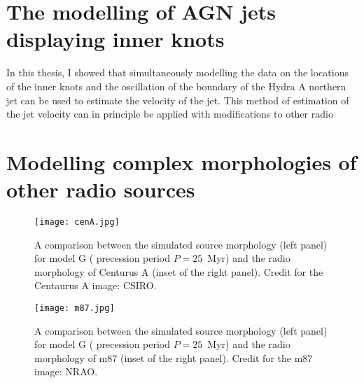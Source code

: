 
\section{The modelling of AGN jets displaying inner knots}
In this thesis, I showed that simultaneously modelling the data on the locations of the inner knots and the oscillation of the boundary of the Hydra A northern jet can be used to estimate the velocity of the jet. This method of estimation of the jet velocity can in principle be applied with modifications to other radio

\section{Modelling complex morphologies of other radio sources}
\begin{figure}
\centering
\texttt{[image: cenA.jpg]}
\caption{ A comparison between the simulated source morphology (left panel) for model G ( precession period $P = 25$~Myr) and the radio morphology of Centurus A (inset of the right panel). Credit for the Centaurus A image: CSIRO.}
\label{f:cenA}
\end{figure}
\begin{figure}
\centering
\texttt{[image: m87.jpg]}
\caption{ A comparison between the simulated source morphology (left panel) for model G ( precession period $P = 25$~Myr) and the radio morphology of m87 (inset of the right panel). Credit for the m87 image: NRAO. }
\label{f:m87}
\end{figure}

